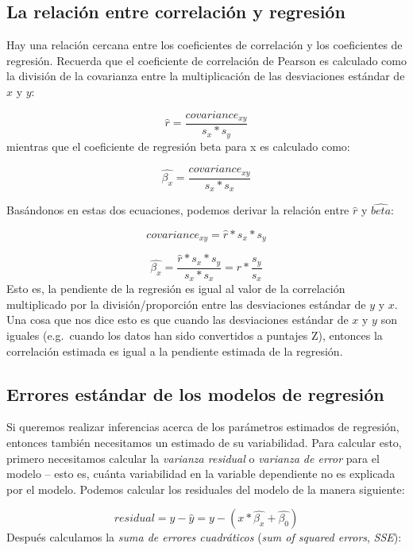 \documentclass[
  12pt,
]{book}
\begin{document}
\hypertarget{la-relaciuxf3n-entre-correlaciuxf3n-y-regresiuxf3n}{%
\subsection{La relación entre correlación y regresión}\label{la-relaciuxf3n-entre-correlaciuxf3n-y-regresiuxf3n}}

Hay una relación cercana entre los coeficientes de correlación y los coeficientes de regresión. Recuerda que el coeficiente de correlación de Pearson es calculado como la división de la covarianza entre la multiplicación de las desviaciones estándar de \(x\) y \(y\):

\[
\hat{r} = \frac{covariance_{xy}}{s_x * s_y}
\]
mientras que el coeficiente de regresión beta para x es calculado como:

\[
\hat{\beta_x} = \frac{covariance_{xy}}{s_x*s_x}
\]

Basándonos en estas dos ecuaciones, podemos derivar la relación entre \(\hat{r}\) y \(\hat{beta}\):

\[
covariance_{xy} = \hat{r} * s_x * s_y
\]

\[
\hat{\beta_x} =  \frac{\hat{r} * s_x * s_y}{s_x * s_x} = r * \frac{s_y}{s_x}
\]
Esto es, la pendiente de la regresión es igual al valor de la correlación multiplicado por la división/proporción entre las desviaciones estándar de \(y\) y \(x\). Una cosa que nos dice esto es que cuando las desviaciones estándar de \(x\) y \(y\) son iguales (e.g.~cuando los datos han sido convertidos a puntajes Z), entonces la correlación estimada es igual a la pendiente estimada de la regresión.

\hypertarget{errores-estuxe1ndar-de-los-modelos-de-regresiuxf3n}{%
\subsection{Errores estándar de los modelos de regresión}\label{errores-estuxe1ndar-de-los-modelos-de-regresiuxf3n}}

Si queremos realizar inferencias acerca de los parámetros estimados de regresión, entonces también necesitamos un estimado de su variabilidad. Para calcular esto, primero necesitamos calcular la \emph{varianza residual} o \emph{varianza de error} para el modelo -- esto es, cuánta variabilidad en la variable dependiente no es explicada por el modelo. Podemos calcular los residuales del modelo de la manera siguiente:

\[
residual = y - \hat{y} = y - (x*\hat{\beta_x} + \hat{\beta_0})
\]
Después calculamos la \emph{suma de errores cuadráticos} (\emph{sum of squared errors}, \emph{SSE}):
\end{document}
